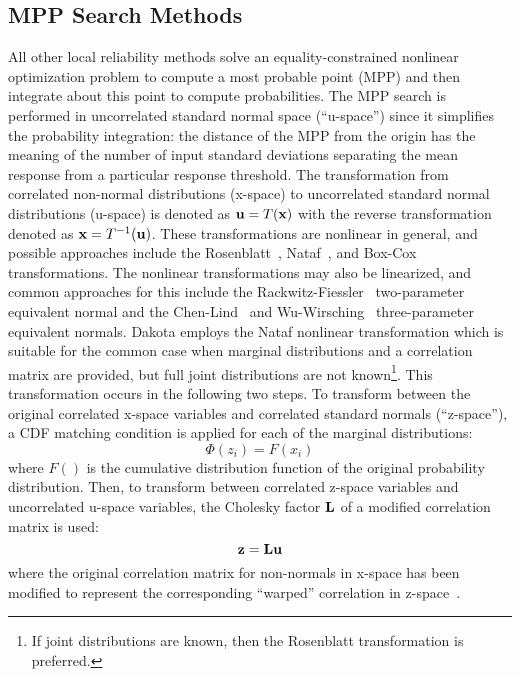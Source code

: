 \subsection{MPP Search Methods}\label{uq:reliability:local:mpp}

All other local reliability methods solve an equality-constrained nonlinear
optimization problem to compute a most probable point (MPP) and then
integrate about this point to compute probabilities.  The MPP search
is performed in uncorrelated standard normal space (``u-space'') since
it simplifies the probability integration: the distance of the MPP
from the origin has the meaning of the number of input standard
deviations separating the mean response from a particular response
threshold.  The transformation from correlated non-normal
distributions (x-space) to uncorrelated standard normal distributions
(u-space) is denoted as ${\bf u} = T({\bf x})$ with the reverse
transformation denoted as ${\bf x} = T^{-1}({\bf u})$.  These
transformations are nonlinear in general, and possible approaches
include the Rosenblatt~\cite{Ros52}, Nataf~\cite{Der86}, and
Box-Cox~\cite{Box64} transformations.  The nonlinear transformations
may also be linearized, and common approaches for this include the
Rackwitz-Fiessler~\cite{Rac78} two-parameter equivalent normal and the
Chen-Lind~\cite{Che83} and Wu-Wirsching~\cite{Wu87} three-parameter
equivalent normals.  Dakota employs the Nataf nonlinear transformation
which is suitable for the common case when marginal distributions and
a correlation matrix are provided, but full joint distributions are
not known\footnote{If joint distributions are known, then the
Rosenblatt transformation is preferred.}.  This transformation occurs 
in the following two steps.  To transform between the
original correlated x-space variables and correlated standard normals
(``z-space''), a CDF matching condition is applied for each of the
marginal distributions:
\begin{equation}
\Phi(z_i) = F(x_i) \label{eq:trans_zx}
\end{equation}
where $F()$ is the cumulative distribution function of the original
probability distribution.  Then, to transform between correlated
z-space variables and uncorrelated u-space variables, the Cholesky 
factor ${\bf L}$ of a modified correlation matrix is used:
\begin{equation}
{\bf z} = {\bf L} {\bf u} \label{eq:trans_zu}
\end{equation}
where the original correlation matrix for non-normals in x-space has
been modified to represent the corresponding ``warped'' correlation in 
z-space~\cite{Der86}.

